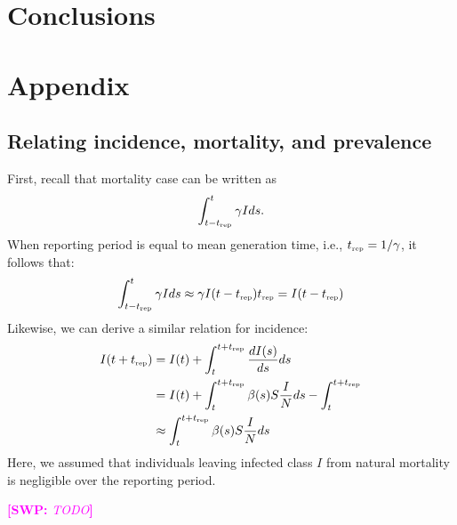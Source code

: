 \documentclass{article}
\newcommand{\comment}[3]{\textcolor{#1}{\textbf{[#2: }\textsl{#3}\textbf{]}}}
\newcommand{\swp}[1]{\comment{magenta}{SWP}{#1}}
\newcommand{\tsub}[2]{#1_{{\textrm{\tiny #2}}}}
\begin{document}
\section{Conclusions}



\pagebreak



\pagebreak

\section{Appendix}

\subsection{Relating incidence, mortality, and prevalence}

First, recall that mortality case can be written as
\begin{equation}
\int_{t-\tsub{t}{rep}}^{t} \gamma I ds.
\end{equation}
When reporting period is equal to mean generation time, i.e., $\tsub{t}{rep} = 1/\gamma$, 
it follows that:
\begin{equation}
\int_{t-\tsub{t}{rep}}^{t} \gamma I ds \approx \gamma I(t-\tsub{t}{rep}) \tsub{t}{rep} = I(t-\tsub{t}{rep})
\end{equation}
Likewise, we can derive a similar relation for incidence:
\begin{equation}
\begin{aligned}
I(t+\tsub{t}{rep}) &= I(t) + \int_{t}^{t+\tsub{t}{rep}} \frac{dI(s)}{ds} ds\\
&= I(t) + \int_{t}^{t+\tsub{t}{rep}} \beta(s) S \frac{I}{N} ds - \int_{t}^{t+\tsub{t}{rep}}\\
&\approx \int_{t}^{t+\tsub{t}{rep}} \beta(s) S \frac{I}{N} ds
\end{aligned}
\end{equation}
Here, we assumed that individuals leaving infected class $I$ from natural mortality is negligible over the reporting period.

\swp{TODO}
\end{document}
